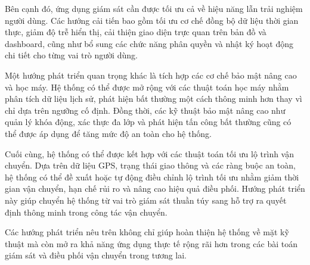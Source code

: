 Bên cạnh đó, ứng dụng giám sát cần được tối ưu cả về hiệu năng lẫn trải nghiệm người dùng. Các hướng cải tiến bao gồm tối ưu cơ chế đồng bộ dữ liệu thời gian thực, giảm độ trễ hiển thị, cải thiện giao diện trực quan trên bản đồ và dashboard, cũng như bổ sung các chức năng phân quyền và nhật ký hoạt động chi tiết cho từng vai trò người dùng.

Một hướng phát triển quan trọng khác là tích hợp các cơ chế bảo mật nâng cao và học máy. Hệ thống có thể được mở rộng với các thuật toán học máy nhằm phân tích dữ liệu lịch sử, phát hiện bất thường một cách thông minh hơn thay vì chỉ dựa trên ngưỡng cố định. Đồng thời, các kỹ thuật bảo mật nâng cao như quản lý khóa động, xác thực đa lớp và phát hiện tấn công bất thường cũng có thể được áp dụng để tăng mức độ an toàn cho hệ thống.

Cuối cùng, hệ thống có thể được kết hợp với các thuật toán tối ưu lộ trình vận chuyển. Dựa trên dữ liệu GPS, trạng thái giao thông và các ràng buộc an toàn, hệ thống có thể đề xuất hoặc tự động điều chỉnh lộ trình tối ưu nhằm giảm thời gian vận chuyển, hạn chế rủi ro và nâng cao hiệu quả điều phối. Hướng phát triển này giúp chuyển hệ thống từ vai trò giám sát thuần túy sang hỗ trợ ra quyết định thông minh trong công tác vận chuyển.

Các hướng phát triển nêu trên không chỉ giúp hoàn thiện hệ thống về mặt kỹ thuật mà còn mở ra khả năng ứng dụng thực tế rộng rãi hơn trong các bài toán giám sát và điều phối vận chuyển trong tương lai.
